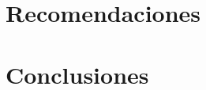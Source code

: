 \documentclass[12pt,letterpaper]{article}
\begin{document}
\section{Recomendaciones}



\section{Conclusiones}

\begin{thebibliography}{99}
\end{thebibliography}
\end{document}

